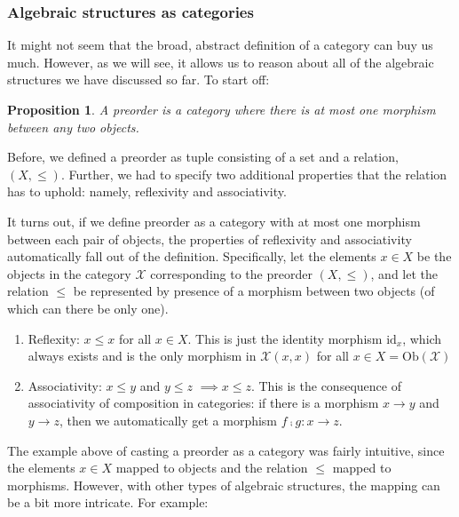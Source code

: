 \documentclass[
]{book}
\providecommand{\tightlist}{%
  \setlength{\itemsep}{0pt}\setlength{\parskip}{0pt}}
\newtheorem{proposition}{Proposition}[chapter]
\theoremstyle{definition}
\theoremstyle{definition}
\theoremstyle{definition}
\theoremstyle{definition}
\theoremstyle{remark}
\begin{document}
\subsubsection{Algebraic structures as categories}\label{algebraic-as-categories}

It might not seem that the broad, abstract definition of a category can buy us much. However, as we will see, it allows us to reason about all of the algebraic structures we have discussed so far. To start off:

\begin{proposition}
A preorder is a category where there is at most one morphism between any two objects.
\end{proposition}

Before, we defined a preorder as tuple consisting of a set and a relation, \((X, \leq)\). Further, we had to specify two additional properties that the relation has to uphold: namely, reflexivity and associativity.

It turns out, if we define preorder as a category with at most one morphism between each pair of objects, the properties of reflexivity and associativity automatically fall out of the definition. Specifically, let the elements \(x \in X\) be the objects in the category \(\mathcal{X}\) corresponding to the preorder \((X, \leq)\), and let the relation \(\leq\) be represented by presence of a morphism between two objects (of which can there be only one).

\begin{enumerate}
\def\labelenumi{\arabic{enumi}.}
\tightlist
\item
  Reflexity: \(x \leq x\) for all \(x \in X\). This is just the identity morphism \(\text{id}_x\), which always exists and is the only morphism in \(\mathcal{X}(x, x)\) for all \(x \in X = \text{Ob}(\mathcal{X})\)
\item
  Associativity: \(x \leq y\) and \(y \leq z\) \(\implies x \leq z\). This is the consequence of associativity of composition in categories: if there is a morphism \(x \to y\) and \(y \to z\), then we automatically get a morphism \(f ⨾g: x \to z\).
\end{enumerate}

The example above of casting a preorder as a category was fairly intuitive, since the elements \(x \in X\) mapped to objects and the relation \(\leq\) mapped to morphisms. However, with other types of algebraic structures, the mapping can be a bit more intricate. For example:
\end{document}
